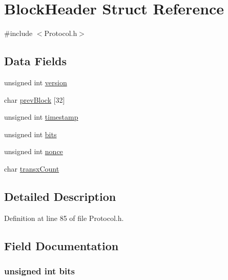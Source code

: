 \hypertarget{struct_block_header}{
\section{BlockHeader Struct Reference}
\label{struct_block_header}
}


{\ttfamily \#include $<$Protocol.h$>$}

\subsection*{Data Fields}
\begin{DoxyCompactItemize}
\item 
unsigned int \hyperlink{struct_block_header_a5408ac5df4c170828874e1b10b4c35a0}{version}
\item 
char \hyperlink{struct_block_header_a099897f937ebe9e9634c5098e38c7cab}{prevBlock} \mbox{[}32\mbox{]}
\item 
unsigned int \hyperlink{struct_block_header_ad4048a3c215cbfcdc127ada8e0fa5445}{timestamp}
\item 
unsigned int \hyperlink{struct_block_header_aa6da25dae1e7263af226d4b026811d7f}{bits}
\item 
unsigned int \hyperlink{struct_block_header_ad73ee4141a6536b03f4e493b56859e86}{nonce}
\item 
char \hyperlink{struct_block_header_a343e4b09bfd545fad5745f6c48f15b69}{transxCount}
\end{DoxyCompactItemize}


\subsection{Detailed Description}


Definition at line 85 of file Protocol.h.



\subsection{Field Documentation}
\hypertarget{struct_block_header_aa6da25dae1e7263af226d4b026811d7f}{
\subsubsection[{bits}]{\setlength{\rightskip}{0pt plus 5cm}unsigned int {\bf bits}}}
\label{struct_block_header_aa6da25dae1e7263af226d4b026811d7f}


